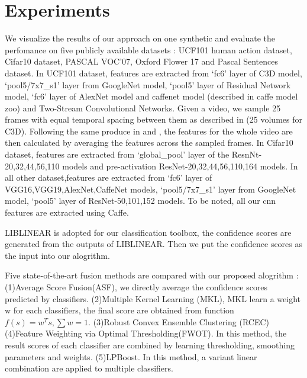 \documentclass[letterpaper]{article}
\begin{document}
\section{Experiments}
We visualize the results of our approach on one synthetic and evaluate the perfomance on five publicly available datasets : UCF101 human action dataset\cite{soomro2012ucf101}, Cifar10\cite{krizhevsky2009learning} dataset, PASCAL VOC’07\cite{pascal-voc-2007}, Oxford Flower 17\cite{nilsback2006visual} and Pascal Sentences dataset. 
In UCF101 dataset, features are extracted from `fc6' layer of C3D model\cite{tran2015learning}, `pool5/7x7\_s1' layer from GoogleNet model\cite{szegedy2015going}, `pool5' layer of Residual Network model\cite{he2015deep}, `fc6' layer of AlexNet\cite{krizhevsky2012imagenet} model\cite{alex} and caffenet model (described in caffe model zoo) and Two-Stream Convolutional Networks. Given a video, we sample 25 frames with equal temporal spacing between them as described in \cite{twostream}(25 volumes for C3D). Following the same produce in \cite{tran2015learning} and \cite{simonyan2014two}, the features for the whole video are then calculated by averaging the features across the sampled frames. 
In Cifar10 dataset, features are extracted from `global\_pool' layer of the ResnNt-20,32,44,56,110 models\cite{he2015deep} and pre-activation ResNet-20,32,44,56,110,164 models\cite{he2016identity}. 
In all other dataset,features are extracted from `fc6' layer of VGG16,VGG19\cite{chatfield2014return},AlexNet,CaffeNet models, `pool5/7x7\_s1' layer from GoogleNet model\cite{szegedy2015going}, `pool5' layer of ResNet-50,101,152 models.
To be noted, all our cnn features are extracted using Caffe\cite{jia2014caffe}.

LIBLINEAR\cite{fan2008liblinear} is adopted for our classification toolbox, the confidence scores are generated from the outputs of LIBLINEAR. Then we put the confidence scores as the input into our alogrithm.

Five state-of-the-art fusion methods are compared with our proposed alogrithm : (1)Average Score Fusion(ASF), we directly average the confidence scores predicted by classifiers. (2)Multiple Kernel Learning (MKL),  MKL learn a weight w for each classifiers, the final score are obtained from function $f(s)=w^{T}s, \sum w = 1$. (3)Robust Convex Ensemble Clustering (RCEC)\cite{gaoijcai2016robust} (4)Feature Weighting via Optimal Thresholding(FWOT)\cite{xuiccv2013feature}. In this method, the result scores of each classifier are combined by learning thresholding, smoothing parameters and weights. (5)LPBoost\cite{gehler2009feature}. In this method, a variant linear combination are applied to multiple classifiers.
\end{document}
